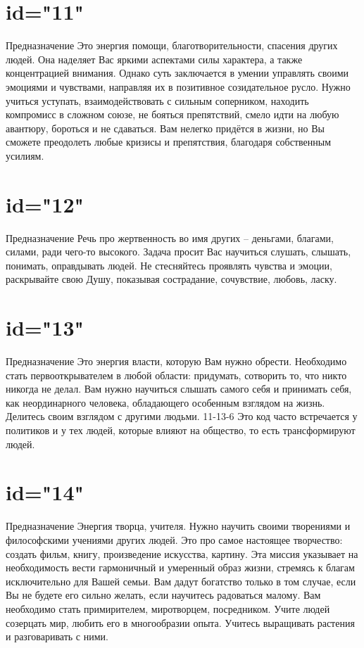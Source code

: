 \section{id="11"}{Предназначение}
Это энергия помощи, благотворительности, спасения других людей.
Она наделяет Вас яркими аспектами силы характера, а также 
концентрацией внимания. Однако суть заключается в умении 
управлять своими эмоциями и чувствами, направляя их в 
позитивное созидательное русло.
Нужно учиться уступать, взаимодействовать с сильным соперником, 
находить компромисс в сложном союзе, не бояться препятствий, 
смело идти на любую авантюру, бороться и не сдаваться. 
Вам нелегко придётся в жизни, но Вы сможете преодолеть 
любые кризисы и препятствия, благодаря собственным усилиям.
\endsection

\section{id="12"}{Предназначение}
Речь про жертвенность во имя других – деньгами, благами, 
силами, ради чего-то высокого.
Задача просит Вас научиться слушать, слышать, понимать, 
оправдывать людей. Не стесняйтесь проявлять чувства и эмоции, 
раскрывайте свою Душу, показывая сострадание, сочувствие, 
любовь, ласку.
\endsection

\section{id="13"}{Предназначение}
Это энергия власти, которую Вам нужно обрести.
Необходимо стать первооткрывателем в любой области: 
придумать, сотворить то, что никто никогда не делал.
Вам нужно научиться слышать самого себя и принимать себя, 
как неординарного человека, обладающего особенным взглядом 
на жизнь. Делитесь своим взглядом с другими людьми.
11-13-6 
Это код часто встречается у политиков и у тех людей, 
которые влияют на общество, то есть трансформируют людей.
\endsection

\section{id="14"}{Предназначение}
Энергия творца, учителя. Нужно научить своими творениями 
и философскими учениями других людей. Это про самое настоящее 
творчество: создать фильм, книгу, произведение искусства, картину.
Эта миссия указывает на необходимость вести гармоничный и 
умеренный образ жизни, стремясь к благам исключительно для 
Вашей семьи. Вам дадут богатство только в том случае, если 
Вы не будете его сильно желать, если научитесь радоваться малому.
Вам необходимо стать примирителем, миротворцем, посредником. 
Учите людей созерцать мир, любить его в многообразии опыта. 
Учитесь выращивать растения и разговаривать с ними.
\endsection

